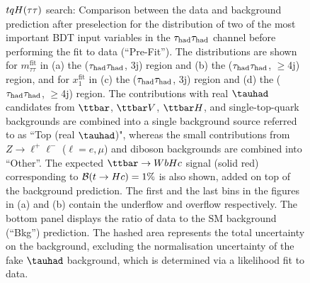 \begin{figure}[t]
\begin{center}
\caption{$tqH(\tau\tau)$ search: Comparison between the data and background prediction after preselection for the distribution of two of the most 
important BDT input variables in the $\tau_{\mathrm{had}} \tau_{\mathrm{had}}$ channel before performing the fit to data (``Pre-Fit''). The distributions are shown for
$m_{\tau\tau}^{\text{fit}}$ in (a) the ($\tau_{\mathrm{had}} \tau_{\mathrm{had}}$, 3j) region and (b) the ($\tau_{\mathrm{had}} \tau_{\mathrm{had}}$, $\geq$4j) region, and for
$x_{1}^{\text{fit}}$ in (c) the ($\tau_{\mathrm{had}} \tau_{\mathrm{had}}$, 3j)  region and (d) the ($\tau_{\mathrm{had}} \tau_{\mathrm{had}}$, $\geq$4j) region.
The contributions with real $\tauhad$ candidates from $\ttbar$,  $\ttbar V$, $\ttbar H$, and single-top-quark backgrounds are combined into
a single background source referred to as ``Top (real $\tauhad$)", whereas the small contributions from 
$Z\to \ell^+\ell^-$ ($\ell = e, \mu$) and diboson backgrounds are combined into ``Other''. 
The expected $\Hc$ signal (solid red) corresponding to $\mathcal{B}(t\to Hc)=1\%$ is also shown,
added on top of the background prediction.
The first and the last bins in the figures in (a) and (b) contain the underflow and overflow respectively.
The bottom panel displays the ratio of data to the SM background (``Bkg'') prediction.
The hashed area represents the total uncertainty on the background, excluding the normalisation uncertainty of the fake $\tauhad$ background, 
which is determined via a likelihood fit to data.} 
\label{fig:BDT_inputs_hadhad}
\end{center}
\end{figure}

